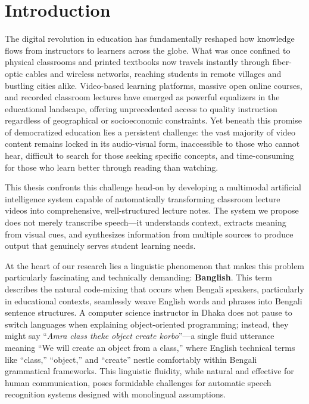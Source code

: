 
\section{Introduction}

The digital revolution in education has fundamentally reshaped how knowledge flows from instructors to learners across the globe. What was once confined to physical classrooms and printed textbooks now travels instantly through fiber-optic cables and wireless networks, reaching students in remote villages and bustling cities alike. Video-based learning platforms, massive open online courses, and recorded classroom lectures have emerged as powerful equalizers in the educational landscape, offering unprecedented access to quality instruction regardless of geographical or socioeconomic constraints. Yet beneath this promise of democratized education lies a persistent challenge: the vast majority of video content remains locked in its audio-visual form, inaccessible to those who cannot hear, difficult to search for those seeking specific concepts, and time-consuming for those who learn better through reading than watching.

This thesis confronts this challenge head-on by developing a multimodal artificial intelligence system capable of automatically transforming classroom lecture videos into comprehensive, well-structured lecture notes. The system we propose does not merely transcribe speech---it understands context, extracts meaning from visual cues, and synthesizes information from multiple sources to produce output that genuinely serves student learning needs.

At the heart of our research lies a linguistic phenomenon that makes this problem particularly fascinating and technically demanding: \textbf{Banglish}. This term describes the natural code-mixing that occurs when Bengali speakers, particularly in educational contexts, seamlessly weave English words and phrases into Bengali sentence structures. A computer science instructor in Dhaka does not pause to switch languages when explaining object-oriented programming; instead, they might say ``\textit{Amra class theke object create korbo}''---a single fluid utterance meaning ``We will create an object from a class,'' where English technical terms like ``class,'' ``object,'' and ``create'' nestle comfortably within Bengali grammatical frameworks. This linguistic fluidity, while natural and effective for human communication, poses formidable challenges for automatic speech recognition systems designed with monolingual assumptions.

